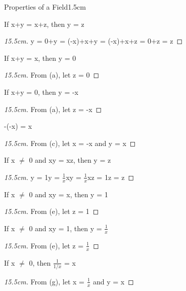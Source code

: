 	\begin{ltheorem}{Properties of a Field}{1.5cm}
		\item If x+y = x+z, then y = z
		
			\begin{proof}[15.5cm]
				y = 0+y = (-x)+x+y = (-x)+x+z = 0+z = z
			\end{proof}
	
		\item If x+y = x, then y = 0

			\begin{proof}[15.5cm]
				From (a), let z = 0
			\end{proof}
	
		\item If x+y = 0, then y = -x
		
			\begin{proof}[15.5cm]
				From (a), let z = -x
			\end{proof}
	
		\item -(-x) = x
		
			\begin{proof}[15.5cm]
				From (c), let x = -x and y = x
			\end{proof}
	
		\item If x $\not =$ 0 and xy = xz, then y = z
			
			\begin{proof}[15.5cm]
				y = 1y = $\frac{1}{x}$xy = $\frac{1}{x}$xz = 1z = z
			\end{proof}
	
		\item If x $\not =$ 0 and xy = x, then y = 1
		
			\begin{proof}[15.5cm]
				From (e), let z = 1
			\end{proof}
	
		\item If x $\not =$ 0 and xy = 1, then y = $\frac{1}{x}$
		
			\begin{proof}[15.5cm]
				From (e), let z = $\frac{1}{x}$
			\end{proof}
	
		\item If x $\not =$ 0, then $\frac{1}{1/x}$ = x
		
			\begin{proof}[15.5cm]
				From (g), let x = $\frac{1}{x}$ and y = x
			\end{proof}


\end{ltheorem}
